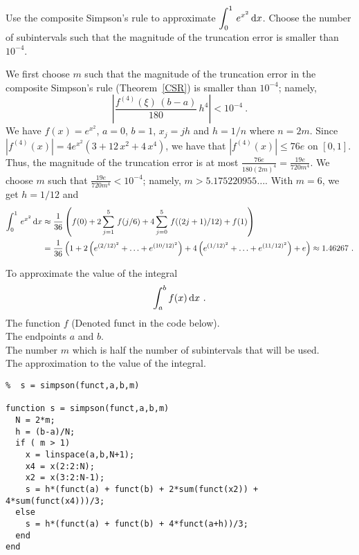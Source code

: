 \begin{egg}
Use the composite Simpson's rule to approximate
$\displaystyle \int_0^1\,e^{x^2}\,\mathrm{d}x$.  Choose
the number of subintervals such that the magnitude of the truncation
error is smaller than $10^{-4}$.

We first choose $m$ such that the magnitude of the truncation error in
the composite Simpson's rule (Theorem~\ref{CSR}) is smaller than
$10^{-4}$; namely,
\[
\left| \frac{f^{(4)}(\xi)\,(b-a)}{180}\,h^4 \right| < 10^{-4} \ .
\]
We have $\displaystyle f(x)=e^{x^2}$, $a=0$, $b=1$, $x_j = jh$ and
$h = 1/n$ where $n=2m$.  Since
$\displaystyle |f^{(4)}(x)|=
4e^{x^2}\left( 3 + 12\,x^2 + 4\,x^4 \right)$, we have 
that $|f^{(4)}(x)| \leq 76e$ on $[0,1]$.  Thus, the magnitude of the
truncation error is at most
$\displaystyle \frac{76e}{180(2m)^4} = \frac{19e}{720 m^4}$.  We
choose $m$ such that $\displaystyle \frac{19e}{720 m^4} < 10^{-4}$;
namely, $m > 5.175220955\ldots$.  With $m=6$, we get $h=1/12$
and
\begin{align*}
\int_0^1\,e^{x^2}\,\mathrm{d}x &\approx
\frac{1}{36}\left(f(0) + 2\sum_{j=1}^{5}\,f(j/6)
+ 4 \sum_{j=0}^{5}\,f((2j+1)/12) + f(1) \right) \\
&= \frac{1}{36}\left( 1 + 2\left(e^{(2/12)^2} + \ldots + e^{(10/12)^2}\right)
+ 4\left( e^{(1/12)^2} + \ldots + e^{(11/12)^2}\right) +e \right)
\approx 1.46267 \ .
\end{align*}
\label{S1}
\end{egg}

\begin{code}
To approximate the value  of the integral
\[
  \int_{a}^{b}f(x)\,\mathrm{d}x \ .
\]
 The function $f$ (Denoted funct in the code below).\\
The endpoints $a$ and $b$.\\
The number $m$ which is half the number of subintervals that will be
used.\\
 The approximation to the value of the integral.
\small
\begin{verbatim}
%  s = simpson(funct,a,b,m)

function s = simpson(funct,a,b,m)
  N = 2*m;
  h = (b-a)/N;
  if ( m > 1)
    x = linspace(a,b,N+1);
    x4 = x(2:2:N);
    x2 = x(3:2:N-1);
    s = h*(funct(a) + funct(b) + 2*sum(funct(x2)) + 4*sum(funct(x4)))/3;
  else
    s = h*(funct(a) + funct(b) + 4*funct(a+h))/3;
  end
end
\end{verbatim}
\end{code}

